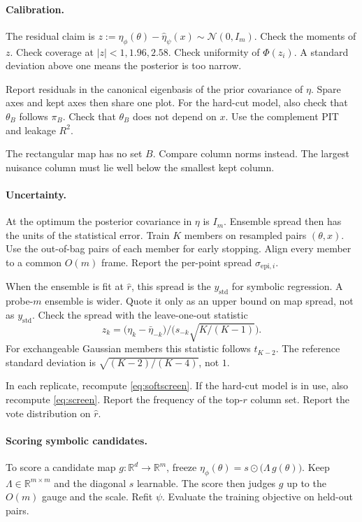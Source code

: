 \documentclass[11pt, letterpaper]{article}
\theoremstyle{definition}
\begin{document}
\paragraph{Calibration.}
The residual claim is
$z:=\eta_\phi(\theta)-\hat\eta_\psi(x)\sim\mathcal{N}(0,I_m)$.
Check the moments of $z$.
Check coverage at $|z|<1,1.96,2.58$.
Check uniformity of $\Phi(z_i)$.
A standard deviation above one means the posterior is too narrow.

Report residuals in the canonical eigenbasis of the prior covariance of
$\eta$. Spare axes and kept axes then share one plot.
For the hard-cut model, also check that $\theta_B$ follows $\pi_B$.
Check that $\theta_B$ does not depend on $x$.
Use the complement PIT and leakage $R^2$.

The rectangular map has no set $B$.
Compare column norms instead.
The largest nuisance column must lie well below the smallest kept column.

\paragraph{Uncertainty.}
At the optimum the posterior covariance in $\eta$ is $I_m$.
Ensemble spread then has the units of the statistical error.
Train $K$ members on resampled pairs $(\theta,x)$.
Use the out-of-bag pairs of each member for early stopping.
Align every member to a common $O(m)$ frame.
Report the per-point spread $\sigma_{\mathrm{epi},i}$.

When the ensemble is fit at $\hat r$, this spread is the $y_{\mathrm{std}}$ for
symbolic regression. A probe-$m$ ensemble is wider.
Quote it only as an upper bound on map spread, not as $y_{\mathrm{std}}$.
Check the spread with the leave-one-out statistic
\[
  z_k=\bigl(\eta_k-\bar\eta_{-k}\bigr)\big/\bigl(s_{-k}\sqrt{K/(K-1)}\bigr) .
\]
For exchangeable Gaussian members this statistic follows $t_{K-2}$.
The reference standard deviation is $\sqrt{(K-2)/(K-4)}$, not $1$.

In each replicate, recompute \eqref{eq:softscreen}.
If the hard-cut model is in use, also recompute \eqref{eq:screen}.
Report the frequency of the top-$r$ column set.
Report the vote distribution on $\hat r$.

\paragraph{Scoring symbolic candidates.}
To score a candidate map $g:\mathbb{R}^d\to\mathbb{R}^{m}$, freeze
$\eta_\phi(\theta)=s\odot\bigl(\Lambda\,g(\theta)\bigr)$.
Keep $\Lambda\in\mathbb{R}^{m\times m}$ and the diagonal $s$ learnable.
The score then judges $g$ up to the $O(m)$ gauge and the scale.
Refit $\psi$. Evaluate the training objective on held-out pairs.
\end{document}
